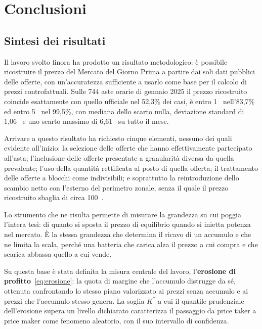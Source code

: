 \chapter{Conclusioni}
\label{cap:conclusioni}

\section{Sintesi dei risultati}
\label{sec:sintesi}


Il lavoro svolto finora ha prodotto un risultato metodologico: \`e possibile ricostruire il
prezzo del Mercato del Giorno Prima a partire dai soli dati pubblici delle offerte, con
un'accuratezza sufficiente a usarlo come base per il calcolo di prezzi controfattuali. Sulle
744 aste orarie di gennaio 2025 il prezzo ricostruito coincide esattamente con quello
ufficiale nel 52{,}3\% dei casi, \`e entro 1~\euromwh{} nell'83{,}7\% ed entro 5~\euromwh{}
nel 99{,}5\%, con mediana dello scarto nulla, deviazione standard di 1{,}06~\euromwh{} e uno
scarto massimo di 6{,}61~\euromwh{} su tutto il mese.

Arrivare a questo risultato ha richiesto cinque elementi, nessuno dei quali evidente
all'inizio: la selezione delle offerte che hanno effettivamente partecipato all'asta;
l'inclusione delle offerte presentate a granularit\`a diversa da quella prevalente;
l'uso della quantit\`a rettificata al posto di quella offerta; il trattamento delle offerte a
blocchi come indivisibili; e soprattutto la reintroduzione dello scambio netto con l'esterno
del perimetro zonale, senza il quale il prezzo ricostruito sbaglia di circa 100~\euromwh{}.

Lo strumento che ne risulta permette di misurare la grandezza su cui poggia l'intera tesi:
di quanto si sposta il prezzo di equilibrio quando si inietta potenza nel mercato. \`E la
stessa grandezza che determina il ricavo di un accumulo e che ne limita la scala, perch\'e
una batteria che carica alza il prezzo a cui compra e che scarica abbassa quello a cui vende.

Su questa base \`e stata definita la misura centrale del lavoro, l'\textbf{erosione di
profitto}~\eqref{eq:erosione}: la quota di margine che l'accumulo distrugge da s\'e, ottenuta
confrontando lo stesso piano valorizzato ai prezzi senza accumulo e ai prezzi che l'accumulo
stesso genera. La soglia $K^*$ a cui il quantile prudenziale dell'erosione supera un livello
dichiarato caratterizza il passaggio da price taker a price maker come fenomeno aleatorio,
con il suo intervallo di confidenza.

